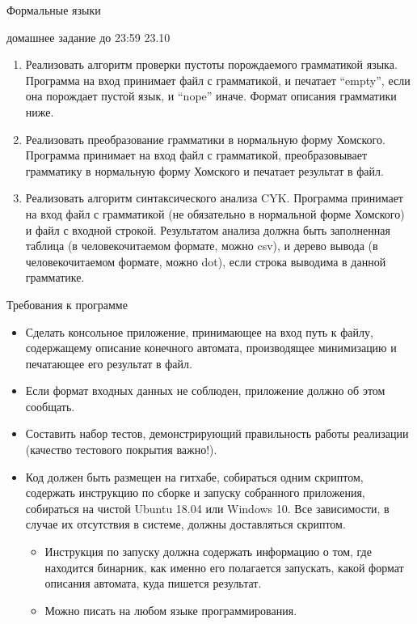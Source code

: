 \documentclass[12pt]{article}
\begin{document}
\begin{center} {\LARGE Формальные языки} \end{center}

\begin{center} {\Large домашнее задание до 23:59 23.10} \end{center}
\bigskip

\begin{enumerate}
  \item 
  {
    Реализовать алгоритм проверки пустоты порождаемого грамматикой языка. Программа на вход принимает файл с грамматикой, и печатает ``empty'', если она порождает пустой язык, и ``nope'' иначе. Формат описания грамматики ниже. 
  }
  \item {
    Реализовать преобразование грамматики в нормальную форму Хомского. Программа принимает на вход файл с грамматикой, преобразовывает грамматику в нормальную форму Хомского и печатает результат в файл. 
 }
  \item 
  {
    Реализовать алгоритм синтаксического анализа CYK. Программа принимает на вход файл с грамматикой (не обязательно в нормальной форме Хомского) и файл с входной строкой. Результатом анализа должна быть заполненная таблица (в человекочитаемом формате, можно csv), и дерево вывода (в человекочитаемом формате, можно dot), если строка выводима в данной грамматике. 

     
  }
\end{enumerate}

\begin{center} Требования к программе \end{center}

\begin{itemize}
    \item Сделать консольное  приложение, принимающее на вход путь к файлу, содержащему описание конечного автомата, производящее минимизацию и печатающее его результат в файл.
    \item Если формат входных данных не соблюден, приложение должно об этом сообщать. 
    \item Составить набор тестов, демонстрирующий правильность работы реализации (качество тестового покрытия важно!).
    \item Код должен быть размещен на гитхабе, собираться одним скриптом, содержать инструкцию по сборке и запуску собранного приложения, собираться на чистой Ubuntu 18.04 или Windows 10. Все зависимости, в случае их отсутствия в системе, должны доставляться скриптом.
    \begin{itemize}
        \item Инструкция по запуску должна содержать информацию о том, где находится бинарник, как именно его полагается запускать, какой формат описания автомата, куда пишется результат.
        \item Можно писать на любом языке программирования. 
    \end{itemize} 
\end{itemize}
\end{document}
